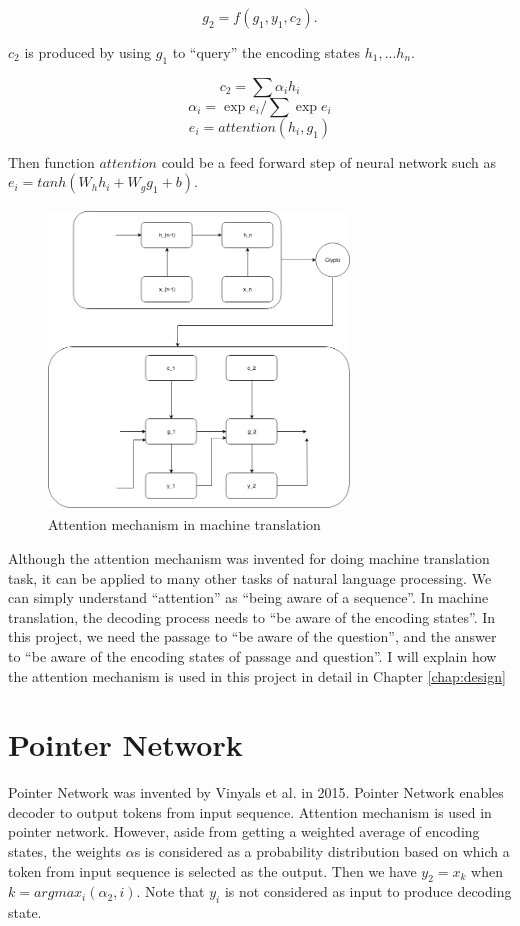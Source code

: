 \documentclass[modernstyle,12pt]{sjsuthesis}
\theoremstyle{definition}
\begin{document}
$$g_2 =f(g_{1},y_{1},c_2).$$

$c_2$ is produced by using $g_1$ to ``query'' the encoding states $h_1, ... h_n$.

$$c_2 = \sum{\alpha _i h_i}$$
$$\alpha _i = \exp{e_i} / \sum{\exp{e_i}}$$
$$e_i = attention(h_i, g_1)$$

Then function $attention$ could be a feed forward step of neural network such as $e_i = tanh(W_h h_i + W_g g_1 + b)$.


\begin{figure}[htbp]\centering
  \includegraphics[width=8cm, height=8cm]{figures/attention}
  \caption{Attention mechanism in machine translation}
  \label{f:attention}
\end{figure}




Although the attention mechanism was invented for doing machine translation task, it can be applied to many other tasks of natural language processing. We can simply understand ``attention'' as ``being aware of a sequence''. In machine translation, the decoding process needs to ``be aware of the encoding states''. In this project, we need the passage to ``be aware of the question'', and the answer to ``be aware of the encoding states of passage and question''. I will explain how the attention mechanism is used in this project in detail in Chapter \ref{chap:design}




\section{Pointer Network}\label{sect:pointerNet}

Pointer Network\cite{vinyals2015pointer} was invented by Vinyals et al. in 2015. Pointer Network enables decoder to output tokens from input sequence. Attention mechanism is used in pointer network. However, aside from getting a weighted average of encoding states, the weights $\alpha$s is considered as a probability distribution based on which a token from input sequence is selected as the output. Then we have $y_2 = x_k$ when $k = argmax_i(\alpha _2,i)$. Note that $y_i$ is not considered as input to produce decoding state.
\end{document}
